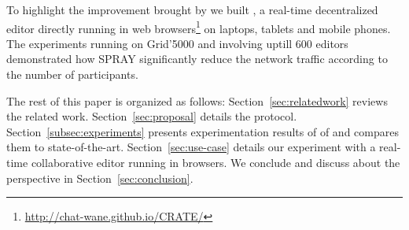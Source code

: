 To highlight the improvement brought by \SPRAY we built \CRATE, a
real-time decentralized editor directly running in web
browsers\footnote{\url{http://chat-wane.github.io/CRATE/}} on laptops,
tablets and mobile phones. The experiments running on Grid'5000 and
involving uptill 600 editors demonstrated how SPRAY significantly
reduce the network traffic according to the number of
participants. 

The rest of this paper is organized as follows:
Section~\ref{sec:relatedwork} reviews the related
work. Section~\ref{sec:proposal} details the \SPRAY
protocol. Section~\ref{subsec:experiments} presents experimentation
results of of \SPRAY and compares them to
state-of-the-art. Section~\ref{sec:use-case} details our experiment
with \CRATE a real-time collaborative editor running in browsers. We
conclude and discuss about the perspective in
Section~\ref{sec:conclusion}.

